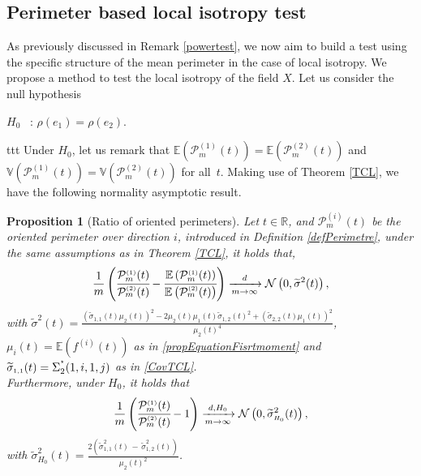\documentclass[12pt]{article}
\renewcommand{\tilde}{\widetilde}
\theoremstyle{Theorem}
\newtheorem{Proposition}[Theorem]{Proposition}
\theoremstyle{definition}
\begin{document}
\subsection{Perimeter based local isotropy test}
As previously discussed in Remark \ref{powertest}, we now aim to build a test using the specific structure of the mean perimeter in the case of local isotropy. We propose a method to test the local isotropy of the field $X$.
Let us consider the null hypothesis
\begin{center}
  $H_{0}$ \, :\; $\rho(e_1) = \rho(e_2)$.
\end{center}ttt
Under $H_{0}$, let us remark that $\mathbb{E}\left(\mathcal{P}^{\scriptscriptstyle  (1) }_{m}(t) \right)= \mathbb{E}\left(\mathcal{P}^{\scriptscriptstyle  (2) }_{m}(t)\right)$ and $\mathbb{V}\left(\mathcal{P}^{\scriptscriptstyle  (1) }_{m}(t) \right)= \mathbb{V}\left(\mathcal{P}^{\scriptscriptstyle  (2) }_{m}(t)\right)$ for all~$t$. Making use of Theorem \ref{TCL}, we have the following normality asymptotic result. 
\begin{Proposition}[Ratio of oriented perimeters]\label{deltamethodgeneralprop} 
Let  $t \in \mathbb{R}$, and $\mathcal{P}_{m}^{\scriptscriptstyle  (i) }(t)$ be the oriented perimeter over direction $i$, introduced in Definition \ref{defPerimetre}, under the same assumptions as in Theorem \ref{TCL}, it holds that,
\begin{equation*}
\frac{1}{m}\left(\cfrac{\mathcal{P}^{\scriptscriptstyle  (1) }_{m}(t)}{\mathcal{P}^{\scriptscriptstyle  (2)}_{m}(t)} - \cfrac{\mathbb{E}\left(\mathcal{P}^{\scriptscriptstyle  (1) }_{m}(t)\right)}{\mathbb{E}\left(\mathcal{P}^{\scriptscriptstyle  (2)}_{m}(t)\right)} \right)  \xrightarrow[m \to \infty]{d} \mathcal{N}\left(0,  \tilde{\sigma}^{2}(t) \right),
\end{equation*}
with $\tilde{\sigma}^{2}(t) = \frac{(\tilde{\sigma}_{\scriptscriptstyle 1,1}(t)\mu_{2}(t))^{2} - 2\mu_{2}(t)\mu_{1}(t)\tilde{\sigma}_{\scriptscriptstyle 1,2}(t)^{2} +(\tilde{\sigma}_{\scriptscriptstyle 2,2}(t)\mu_{1}(t))^{2}}{\mu_{2}(t)^4}$, $\mu_{i}(t) = \mathbb{E}(f^{(i)}(t))$ as in \eqref{propEquationFisrtmoment} \linebreak and $\tilde{\sigma}_{\scriptscriptstyle 1,1}(t) = \Sigma^{\textcolor{white}{ }^{\star}}_{2}(1,i,1,j)$ as in \eqref{CovTCL}. \\
Furthermore, under $H_{0}$, it holds that
\begin{equation}\label{ratiounderH0}
\frac{1}{m}\left(\cfrac{\mathcal{P}^{\scriptscriptstyle  (1) }_{m}(t)}{\mathcal{P}^{\scriptscriptstyle  (2) }_{m}(t)} - 1 \right)  \xrightarrow[m \to \infty]{d, H_0} \mathcal{N}\left(0,  \tilde{\sigma}_{\scriptscriptstyle H_{0}}^{2}(t)  \right),
\end{equation} 
with $\tilde{\sigma}_{\scriptscriptstyle H_{0}}^{2}(t) = \frac{2\left(\tilde{\sigma}_{\scriptscriptstyle 1,1}^{2}(t) \, - \, \tilde{\sigma}_{\scriptscriptstyle 1,2}^{2}(t)\right)}{\mu_{2}(t)^2}$.
\end{Proposition}
\end{document}
